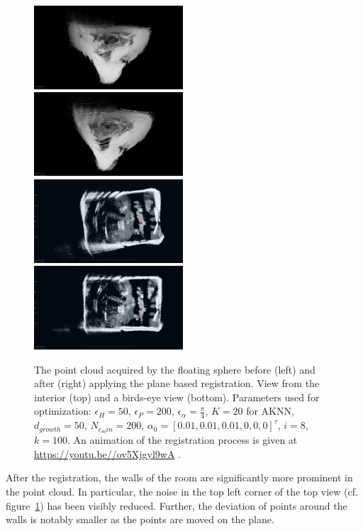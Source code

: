 \begin{figure}
	\centering
	\includegraphics[width=0.495\textwidth]{./images/cylon_uncorr_corner}\hfill
	\includegraphics[width=0.495\textwidth]{./images/cylon_corr_corner}\\
	\includegraphics[width=0.495\textwidth]{./images/cylon_uncorr_top}\hfill
	\includegraphics[width=0.495\textwidth]{./images/cylon_corr_top}
	\caption{The point cloud acquired by the floating sphere before (left) and after (right) applying the plane based registration. View from the interior (top) and a birds-eye view (bottom). Parameters used for optimization: $\epsilon_H = 50$, $\epsilon_P = 200$, $\epsilon_\alpha = \frac{\pi}{4}$, $K = 20$ for AKNN, $d_{growth} = 50$, $N_{c_min} = 200$, $\alpha_0 = [0.01, 0.01, 0.01, 0, 0, 0]^\tau$, $i = 8$, $k = 100$. An animation of the registration process is given at \url{https://youtu.be//ov5Xjgyl9wA} .}
	\label{fig:cylon-corrected}
\end{figure}
After the registration, the walls of the room are significantly more prominent in the point cloud. 
In particular, the noise in the top left corner of the top view (cf. figure~\ref{fig:cylon-corrected}) has been visibly reduced.
Further, the deviation of points around the walls is notably smaller as the points are moved on the plane.

